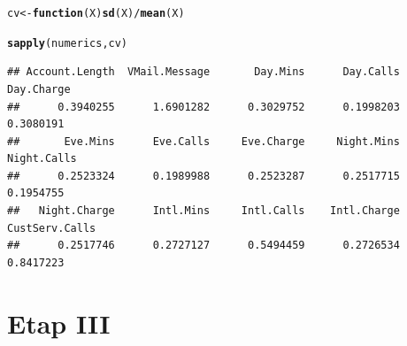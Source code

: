 \documentclass{article}\usepackage[]{graphicx}\usepackage[]{color}
\makeatletter
\newcommand{\hlopt}[1]{\textcolor[rgb]{0,0,0}{#1}}%
\newcommand{\hlstd}[1]{\textcolor[rgb]{0.345,0.345,0.345}{#1}}%
\newcommand{\hlkwa}[1]{\textcolor[rgb]{0.161,0.373,0.58}{\textbf{#1}}}%
\newcommand{\hlkwb}[1]{\textcolor[rgb]{0.69,0.353,0.396}{#1}}%
\newcommand{\hlkwc}[1]{\textcolor[rgb]{0.333,0.667,0.333}{#1}}%
\newcommand{\hlkwd}[1]{\textcolor[rgb]{0.737,0.353,0.396}{\textbf{#1}}}%
\newenvironment{kframe}{%
 \def\at@end@of@kframe{}%
 \ifinner\ifhmode%
  \def\at@end@of@kframe{\end{minipage}}%
  \begin{minipage}{\columnwidth}%
 \fi\fi%
 \def\FrameCommand##1{\hskip\@totalleftmargin \hskip-\fboxsep
 \colorbox{shadecolor}{##1}\hskip-\fboxsep
     \hskip-\linewidth \hskip-\@totalleftmargin \hskip\columnwidth}%
 \MakeFramed {\advance\hsize-\width
   \@totalleftmargin\z@ \linewidth\hsize
   \@setminipage}}%
 {\par\unskip\endMakeFramed%
 \at@end@of@kframe}
\newenvironment{knitrout}{}{} %
\makeatother
\begin{document}
\begin{description}
\begin{knitrout}
\color{fgcolor}\begin{kframe}
\begin{alltt}
\hlstd{cv} \hlkwb{<-} \hlkwa{function}\hlstd{(}\hlkwc{X}\hlstd{)} \hlkwd{sd}\hlstd{(X)} \hlopt{/} \hlkwd{mean}\hlstd{(X)}

\hlkwd{sapply}\hlstd{(numerics, cv)}
\end{alltt}
\begin{verbatim}
## Account.Length  VMail.Message       Day.Mins      Day.Calls     Day.Charge 
##      0.3940255      1.6901282      0.3029752      0.1998203      0.3080191 
##       Eve.Mins      Eve.Calls     Eve.Charge     Night.Mins    Night.Calls 
##      0.2523324      0.1989988      0.2523287      0.2517715      0.1954755 
##   Night.Charge      Intl.Mins     Intl.Calls    Intl.Charge CustServ.Calls 
##      0.2517746      0.2727127      0.5494459      0.2726534      0.8417223
\end{verbatim}
\end{kframe}
\end{knitrout}

\end{description}

\section{Etap III}
\end{document}

